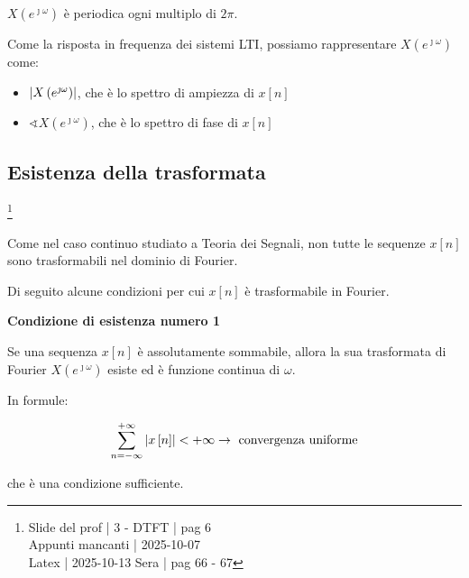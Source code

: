 $X \left(e^{\jmath \omega}\right)$ è periodica ogni multiplo di $2 \pi$. \newline 

Come la risposta in frequenza dei sistemi LTI, 
possiamo rappresentare $X \left(e^{\jmath \omega}\right)$ come: 

\begin{itemize}
    \item $\abs{X \left(e^{\jmath \omega}\right)}$, che è lo spettro di ampiezza di $x \left[ n\right]$ 
    \item $\sphericalangle X \left(e^{\jmath \omega}\right)$, che è lo spettro di fase di $x \left[ n\right]$
\end{itemize}

\newpage 

\subsection{Esistenza della trasformata} \label{subsec: Esistenza della trasformata}

\footnote{ 
    Slide del prof | 3 - DTFT | pag 6\\
    Appunti mancanti | 2025-10-07 \\ 
    Latex | 2025-10-13 Sera | pag 66 - 67
}

Come nel caso continuo studiato a Teoria dei Segnali, 
non tutte le sequenze $x \left[ n\right]$ sono trasformabili nel dominio di Fourier. \newline 

Di seguito alcune condizioni per cui $x \left[ n\right]$ è trasformabile in Fourier. \newline 

\textbf{Condizione di esistenza numero 1} \newline 

Se una sequenza $x \left[ n\right]$ è assolutamente sommabile, 
allora la sua trasformata di Fourier $X \left( e^{\jmath \omega }\right)$ esiste ed è funzione continua di $\omega$. \newline 

In formule: 

{
    \Large 
    \begin{equation}
        \sum_{n = - \infty}^{+ \infty}
        \abs{x \left[ n\right]} 
        < 
        + \infty
        \to 
        \text{ convergenza uniforme}
    \end{equation}
} 

che è una condizione sufficiente. \newline 

